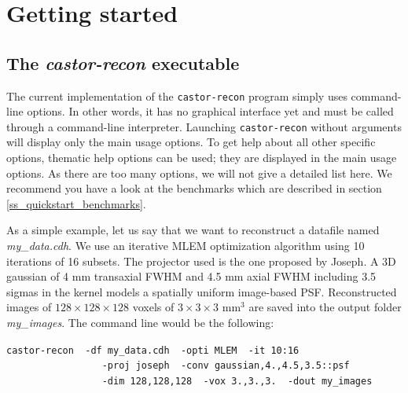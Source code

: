 \documentclass[a4paper, 11pt]{article}
\begin{document}
\section{Getting started}
\label{s_quickstart}

\subsection{The \textit{castor-recon} executable}
\label{ss_quickstart_executable}

The current implementation of the \verb|castor-recon| program simply uses command-line options. In other words, it has no graphical interface yet and must be called
through a command-line interpreter. Launching \verb|castor-recon| without arguments will display only the main usage options. To get help about all other specific
options, thematic help options can be used; they are displayed in the main usage options. As there are too many options, we will not give a detailed list here. We
recommend you have a look at the benchmarks which are described in section \ref{ss_quickstart_benchmarks}.

As a simple example, let us say that we want to reconstruct a datafile named \textit{my\_data.cdh}. We use an iterative MLEM optimization algorithm using 10 iterations
of 16 subsets. The projector used is the one proposed by Joseph\cite{Joseph}. A 3D gaussian of 4 mm transaxial FWHM and 4.5 mm axial FWHM including 3.5 sigmas in the
kernel models a spatially uniform image-based PSF. Reconstructed images of $128\times128\times128$ voxels of $3\times3\times3$ mm$^3$ are saved into the output folder
\textit{my\_images}. The command line would be the following:

\verb|castor-recon  -df my_data.cdh  -opti MLEM  -it 10:16| \\
\verb|                 -proj joseph  -conv gaussian,4.,4.5,3.5::psf| \\
\verb|                 -dim 128,128,128  -vox 3.,3.,3.  -dout my_images|

\end{document}
